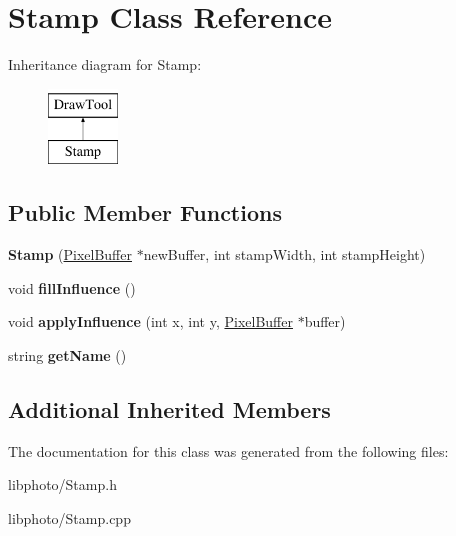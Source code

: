 \hypertarget{classStamp}{\section{Stamp Class Reference}
\label{classStamp}
}
Inheritance diagram for Stamp\-:\begin{figure}[H]
\begin{center}
\leavevmode
\includegraphics[height=2.000000cm]{classStamp}
\end{center}
\end{figure}
\subsection*{Public Member Functions}
\begin{DoxyCompactItemize}
\item 
\hypertarget{classStamp_a92ac49815361090e983b1adf13451dc5}{{\bfseries Stamp} (\hyperlink{classPixelBuffer}{Pixel\-Buffer} $\ast$new\-Buffer, int stamp\-Width, int stamp\-Height)}\label{classStamp_a92ac49815361090e983b1adf13451dc5}

\item 
\hypertarget{classStamp_a327f68b52c3043a538180461d5b96cb9}{void {\bfseries fill\-Influence} ()}\label{classStamp_a327f68b52c3043a538180461d5b96cb9}

\item 
\hypertarget{classStamp_ab41c9de007e2ad05a6b47e62b41fd7df}{void {\bfseries apply\-Influence} (int x, int y, \hyperlink{classPixelBuffer}{Pixel\-Buffer} $\ast$buffer)}\label{classStamp_ab41c9de007e2ad05a6b47e62b41fd7df}

\item 
\hypertarget{classStamp_a54417cc458c5c2169da9709c33591480}{string {\bfseries get\-Name} ()}\label{classStamp_a54417cc458c5c2169da9709c33591480}

\end{DoxyCompactItemize}
\subsection*{Additional Inherited Members}


The documentation for this class was generated from the following files\-:\begin{DoxyCompactItemize}
\item 
libphoto/Stamp.\-h\item 
libphoto/Stamp.\-cpp\end{DoxyCompactItemize}
